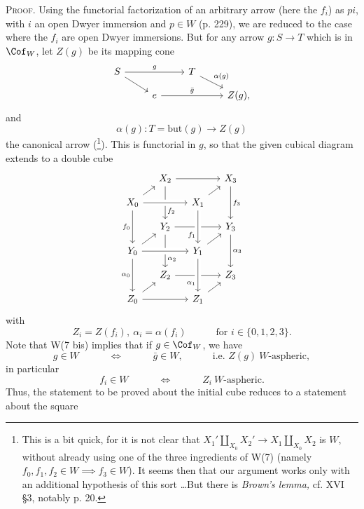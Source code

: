 \textsc{Proof.} Using the functorial factorization
of an arbitrary arrow (here the $f_i$) as $pi$, with $i$ an open Dwyer immersion and $p \in W$ (p. 229), we are reduced to the case where the $f_i$ are open Dwyer immersions. But for any arrow $g : S \longrightarrow T$ which is in $\Cof_W$, let $Z(g)$ be its mapping cone %
\[
\begin{tikzcd}[ampersand replacement=\&, row sep=small]
S \arrow[rr, "g"] \arrow[dr] \& \& T \arrow[dr, "\alpha(g)"] \& \\
 \& e \arrow[rr, "\bar{g}"] \& \& Z(g),
\end{tikzcd}
\]
and
\[
\alpha(g) : T = \mathrm{but}(g) \longrightarrow Z(g)
\]
the canonical arrow (\footnote[136]{This is a bit quick, for it is not clear that $X_1' \amalg_{X_0} X_2' \longrightarrow X_1 \amalg_{X_0} X_2$ is $W$, without already using one of the three ingredients of W(7) (namely $f_0, f_1, f_2 \in W \implies f_3 \in W$). It seems then that our argument works only with an additional hypothesis of this sort \dots But there is \textit{Brown's lemma,} cf. XVI \S3, notably p. 20.}). This is functorial in $g$, so that the given cubical diagram extends to a double cube
\[
\begin{tikzcd}[ampersand replacement=\&, row sep=small, column sep=small]
 \& X_2 \arrow[rr] \arrow[dd, "f_2" near end] \& \& X_3 \arrow[dd, "f_3"] \\
X_0 \arrow[ur] \arrow[rr, crossing over] \arrow[dd, "f_0"'] \& \& X_1 \arrow[ur] \& \\
 \& Y_2 \arrow[rr] \arrow[dd, "\alpha_2" near end] \& \& Y_3 \arrow[dd, "\alpha_3"] \\
Y_0 \arrow[ur] \arrow[rr, crossing over] \arrow[dd, "\alpha_0"'] \& \& Y_1 \arrow[ur] \arrow[from=uu, crossing over, "f_1"' near end] \& \\
 \& Z_2 \arrow[rr] \& \& Z_3 \\
Z_0 \arrow[ur] \arrow[rr] \& \& Z_1 \arrow[ur] \arrow[from=uu, crossing over, "\alpha_1"' near end] \&
\end{tikzcd}
\]
with
\[
Z_i = Z(f_i),\ \alpha_i = \alpha(f_i) \qquad\quad \text{for } i \in \{0,1,2,3\}.
\]
Note that W(7 bis) implies that if $g \in \Cof_W$,
we have
\[
g \in W \qquad\quad \iff \qquad\quad \bar{g} \in W, \qquad\quad \text{i.e. } Z(g)\ W\text{-aspheric},
\]
in particular
\[
f_i \in W \qquad\quad \iff \qquad\quad Z_i\ W\text{-aspheric}.
\]
Thus, the statement to be proved about the initial cube reduces to a statement about the square
